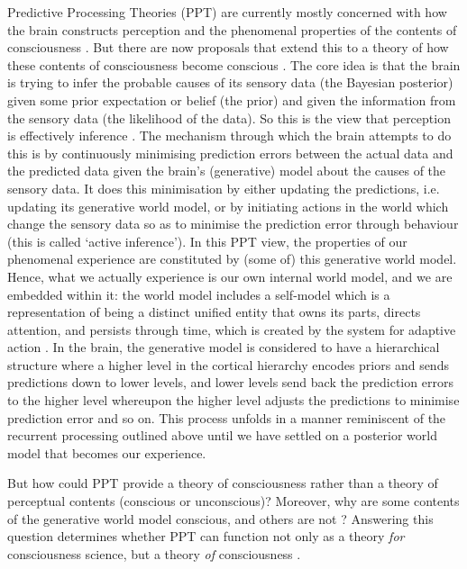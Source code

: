 \documentclass[11pt, a4paper, onecolumn, gdm]{google}
\begin{document}
Predictive Processing Theories (PPT) are currently mostly concerned with how the brain constructs perception and the phenomenal properties of the contents of consciousness \citep{deane2021,wiese2024,ramstead2024}.
But there are now proposals that extend this to a theory of how these contents of consciousness become conscious \citep{laukkonen2025,whyte2025,friston2018}.
The core idea is that the brain is trying to infer the probable causes of its sensory data (the Bayesian posterior) given some prior expectation or belief (the prior) and given the information from the sensory data (the likelihood of the data).
So this is the view that perception is effectively inference \citep{vonhelmholtz1867}.
The mechanism through which the brain attempts to do this is by continuously minimising prediction errors between the actual data and the predicted data given the brain's (generative) model about the causes of the sensory data.
It does this minimisation by either updating the predictions, i.e. updating its generative world model, or by initiating actions in the world which change the sensory data so as to minimise the prediction error through behaviour (this is called `active inference').
In this PPT view, the properties of our phenomenal experience are constituted by (some of) this generative world model.
Hence, what we actually experience is our own internal world model, and we are embedded within it: the world model includes a self-model which is a representation of being a distinct unified entity that owns its parts, directs attention, and persists through time, which is created by the system for adaptive action \citep{metzinger2004}.
In the brain, the generative model is considered to have a hierarchical structure where a higher level in the cortical hierarchy encodes priors and sends predictions down to lower levels, and lower levels send back the prediction errors to the higher level whereupon the higher level adjusts the predictions to minimise prediction error and so on.
This process unfolds in a manner reminiscent of the recurrent processing outlined above until we have settled on a posterior world model that becomes our experience.

But how could PPT provide a theory of consciousness rather than a theory of perceptual contents (conscious or unconscious)?
Moreover, why are some contents of the generative world model conscious, and others are not \citep{hohwy2022}?
Answering this question determines whether PPT can function not only as a theory \emph{for} consciousness science, but a theory \emph{of} consciousness \citep{seth2022}.
\end{document}
